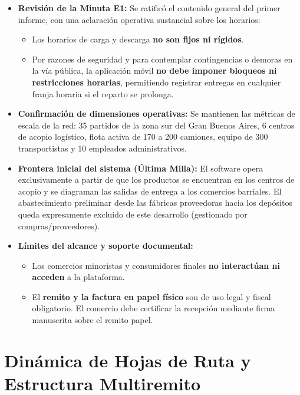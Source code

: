 \documentclass[11pt,a4paper]{article}
\begin{document}
\begin{itemize}
  \item \textbf{Revisión de la Minuta E1:} Se ratificó el contenido general del primer informe, con una aclaración operativa sustancial sobre los horarios:
  \begin{itemize}
    \item Los horarios de carga y descarga \textbf{no son fijos ni rígidos}.
    \item Por razones de seguridad y para contemplar contingencias o demoras en la vía pública, la aplicación móvil \textbf{no debe imponer bloqueos ni restricciones horarias}, permitiendo registrar entregas en cualquier franja horaria si el reparto se prolonga.
  \end{itemize}
  \item \textbf{Confirmación de dimensiones operativas:} Se mantienen las métricas de escala de la red: 35 partidos de la zona sur del Gran Buenos Aires, 6 centros de acopio logístico, flota activa de 170 a 200 camiones, equipo de 300 transportistas y 10 empleados administrativos.
  \item \textbf{Frontera inicial del sistema (Última Milla):} El software opera exclusivamente a partir de que los productos se encuentran en los centros de acopio y se diagraman las salidas de entrega a los comercios barriales. El abastecimiento preliminar desde las fábricas proveedoras hacia los depósitos queda expresamente excluido de este desarrollo (gestionado por compras/proveedores).
  \item \textbf{Límites del alcance y soporte documental:}
  \begin{itemize}
    \item Los comercios minoristas y consumidores finales \textbf{no interactúan ni acceden} a la plataforma.
    \item El \textbf{remito y la factura en papel físico} son de uso legal y fiscal obligatorio. El comercio debe certificar la recepción mediante firma manuscrita sobre el remito papel.
  \end{itemize}
\end{itemize}

\section{Dinámica de Hojas de Ruta y Estructura Multiremito}
\end{document}

